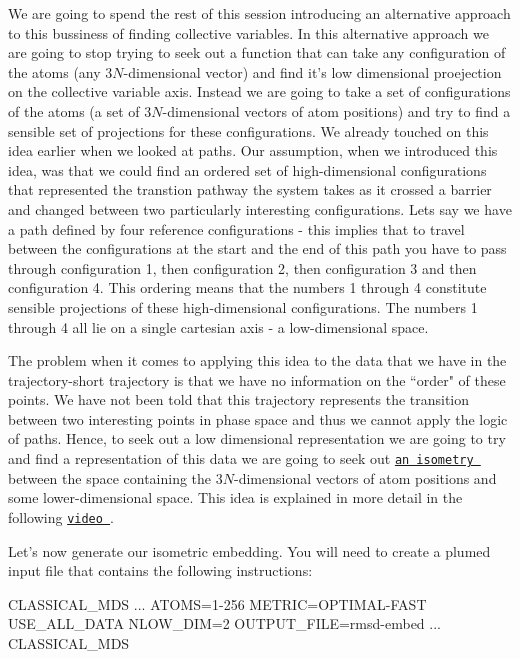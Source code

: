 We are going to spend the rest of this session introducing an alternative approach to this bussiness of finding collective variables. In this alternative approach we are going to stop trying to seek out a function that can take any configuration of the atoms (any $3N$-\/dimensional vector) and find it's low dimensional proejection on the collective variable axis. Instead we are going to take a set of configurations of the atoms (a set of $3N$-\/dimensional vectors of atom positions) and try to find a sensible set of projections for these configurations. We already touched on this idea earlier when we looked at paths. Our assumption, when we introduced this idea, was that we could find an ordered set of high-\/dimensional configurations that represented the transtion pathway the system takes as it crossed a barrier and changed between two particularly interesting configurations. Lets say we have a path defined by four reference configurations -\/ this implies that to travel between the configurations at the start and the end of this path you have to pass through configuration 1, then configuration 2, then configuration 3 and then configuration 4. This ordering means that the numbers 1 through 4 constitute sensible projections of these high-\/dimensional configurations. The numbers 1 through 4 all lie on a single cartesian axis -\/ a low-\/dimensional space.

The problem when it comes to applying this idea to the data that we have in the trajectory-\/short trajectory is that we have no information on the ``order" of these points. We have not been told that this trajectory represents the transition between two interesting points in phase space and thus we cannot apply the logic of paths. Hence, to seek out a low dimensional representation we are going to try and find a representation of this data we are going to seek out \href{http://en.wikipedia.org/wiki/Isometry}{\tt an isometry } between the space containing the $3N$-\/dimensional vectors of atom positions and some lower-\/dimensional space. This idea is explained in more detail in the following \href{https://www.youtube.com/watch?v=ofC2qz0_9_A&feature=youtu.be}{\tt video }.

Let's now generate our isometric embedding. You will need to create a plumed input file that contains the following instructions\+:

\begin{DoxyVerb}CLASSICAL_MDS ...
  ATOMS=1-256
  METRIC=OPTIMAL-FAST
  USE_ALL_DATA
  NLOW_DIM=2
  OUTPUT_FILE=rmsd-embed
... CLASSICAL_MDS
\end{DoxyVerb}


